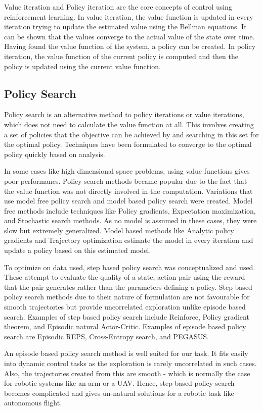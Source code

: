\documentclass[hidelinks,BTech]{iitmdiss}
\begin{document}
Value iteration and Policy iteration are the core concepts of control using reinforcement learning. In value iteration, the value function is updated in every iteration trying to update the estimated value using the Bellman equations. It can be shown that the values converge to the actual value of the state over time. Having found the value function of the system, a policy can be created. In policy iteration, the value function of the current policy is computed and then the policy is updated using the current value function.

\subsection*{Policy Search}
Policy search is an alternative method to policy iterations or value iterations, which does not need to calculate the value function at all. This involves creating a set of policies that the objective can be achieved by and searching in this set for the optimal policy. Techniques have been formulated to converge to the optimal policy quickly based on analysis.

In some cases like high dimensional space problems, using value functions gives poor performancs. Policy search methods became popular due to the fact that the value function was not directly involved in the computation. Variations that use model free policy search and model based policy search were created. Model free methods include techniques like Policy gradients, Expectation maximization, and Stochastic search methods. As no model is assumed in these cases, they were slow but extremely generalized. Model based methods like Analytic policy gradients and Trajectory optimization estimate the model in every iteration and update a policy based on this estimated model.

To optimize on data used, step based policy search was conceptualized and used. These attempt to evaluate the quality of a state, action pair using the reward that the pair generates rather than the parameters defining a policy. Step based policy search methods due to their nature of formulation are not favourable for smooth trajectories but provide uncorrelated exploration unlike episode based search. Examples of step based policy search include Reinforce, Policy gradient theorem, and Episodic natural Actor-Critic. Examples of episode based policy search are Episodic REPS, Cross-Entropy search, and PEGASUS.

An episode based policy search method is well suited for our task. It fits easily into dynamic control tasks as the exploration is rarely uncorrelated in such cases. Also, the trajectories created from this are smooth - which is normally the case for robotic systems like an arm or a UAV. Hence, step-based policy search becomes complicated and gives un-natural solutions for a robotic task like autonomous flight.
\end{document}
